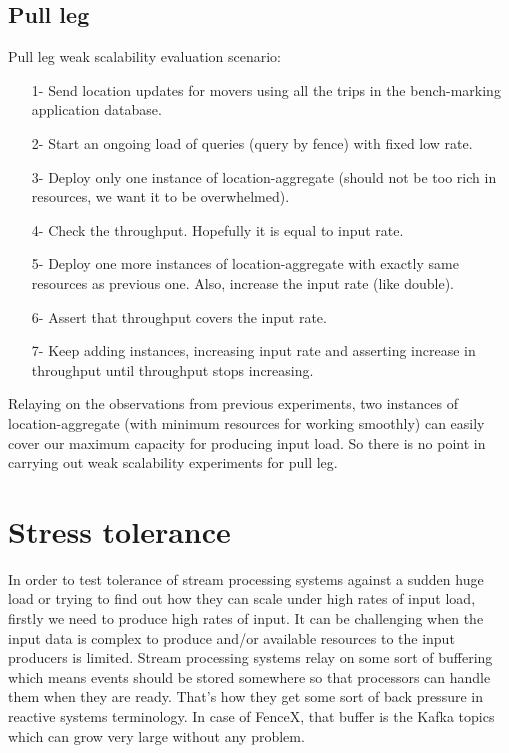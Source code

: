 \documentclass[a4]{report}
\begin{document}
    \subsection{Pull leg}
    Pull leg weak scalability evaluation scenario:
    \begin{itemize}
        \item[1-] Send location updates for movers using all the trips in the bench-marking application database.
        \item[2-] Start an ongoing load of queries (query by fence) with fixed low rate.
        \item[3-] Deploy only one instance of location-aggregate (should not be too rich in resources, we want it to
        be overwhelmed).
        \item[4-] Check the throughput.
        Hopefully it is equal to input rate.
        \item[5-] Deploy one more instances of location-aggregate with exactly same resources as previous one. Also,
        increase the input rate (like double).
        \item[6-] Assert that throughput covers the input rate.
        \item[7-] Keep adding instances, increasing input rate and asserting increase in throughput until throughput
        stops increasing.
    \end{itemize}

    Relaying on the observations from previous experiments, two instances of location-aggregate (with minimum
    resources for working smoothly) can easily cover our maximum capacity for producing input load.
    So there is no point in carrying out weak scalability experiments for pull leg.


    \section{Stress tolerance}
    In order to test tolerance of stream processing systems against a sudden huge load or trying to find out how
    they can scale under high rates of input load, firstly we need to produce high rates of input.
    It can be challenging when the input data is complex to produce and/or available resources to the input producers
    is limited.
    Stream processing systems relay on some sort of buffering which means events should be stored somewhere so
    that processors can handle them when they are ready.
    That's how they get some sort of back pressure in reactive systems terminology.
    In case of FenceX, that buffer is the Kafka topics which can grow very large without any problem.
\end{document}
